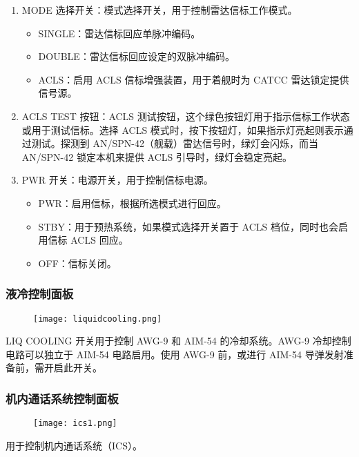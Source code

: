 \begin{enumerate}
  \item MODE 选择开关：模式选择开关，用于控制雷达信标工作模式。
  \begin{itemize}
    \item SINGLE：雷达信标回应单脉冲编码。
    \item DOUBLE：雷达信标回应设定的双脉冲编码。
    \item ACLS：启用 ACLS 信标增强装置，用于着舰时为 CATCC 雷达锁定提供信号源。
  \end{itemize}
  \item ACLS TEST 按钮：ACLS 测试按钮，这个绿色按钮灯用于指示信标工作状态或用于测试信标。选择 ACLS 模式时，按下按钮灯，如果指示灯亮起则表示通过测试。探测到 AN/SPN-42（舰载）雷达信号时，绿灯会闪烁，而当 AN/SPN-42 锁定本机来提供 ACLS 引导时，绿灯会稳定亮起。
  \item PWR 开关：电源开关，用于控制信标电源。
  \begin{itemize}
    \item PWR：启用信标，根据所选模式进行回应。
    \item STBY：用于预热系统，如果模式选择开关置于 ACLS 档位，同时也会启用信标 ACLS 回应。
    \item OFF：信标关闭。
  \end{itemize}
\end{enumerate}

\subsubsection{液冷控制面板}
\begin{figure}[htb]
  \center
  \texttt{[image: liquidcooling.png]}
\end{figure}
LIQ COOLING 开关用于控制 AWG-9 和 AIM-54 的冷却系统。AWG-9 冷却控制电路可以独立于 AIM-54 电路启用。使用 AWG-9 前，或进行 AIM-54 导弹发射准备前，需开启此开关。

\subsubsection{机内通话系统控制面板}
\begin{figure}[htb]
  \center
  \texttt{[image: ics1.png]}
\end{figure}
用于控制机内通话系统（ICS）。

